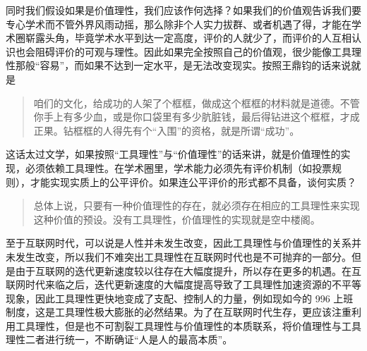 同时我们假设如果是价值理性，我们应该作何选择？如果我们的价值观告诉我们要专心学术而不管外界风雨动摇，那么除非个人实力拔群、或者机遇了得，才能在学术圈崭露头角，毕竟学术水平到达一定高度，评价的人就少了，而评价的人互相认识也会阻碍评价的可观与理性。因此如果完全按照自己的价值观，很少能像工具理性那般“容易”，而如果不达到一定水平，是无法改变现实。按照王鼎钧的话来说就是
\begin{quotation}
    咱们的文化，给成功的人架了个框框，做成这个框框的材料就是道德。不管你手上有多少血，或是你口袋里有多少肮脏钱，最后得钻进这个框框，才成正果。钻框框的人得先有个“入围”的资格，就是所谓“成功”。\cite{wiki2019王鼎钧}
\end{quotation}
这话太过文学，如果按照“工具理性”与“价值理性”的话来讲，就是价值理性的实现，必须依赖工具理性。在学术圈里，学术能力必须先有评价机制（如投票规则），才能实现实质上的公平评价。如果连公平评价的形式都不具备，谈何实质？
\begin{quotation}
    总体上说，只要有一种价值理性的存在，就必须存在相应的工具理性来实现这种价值的预设。没有工具理性，价值理性的实现就是空中楼阁。\cite{mba2019工具理性}
\end{quotation}

至于互联网时代，可以说是人性并未发生改变，因此工具理性与价值理性的关系并未发生改变，所以我们不难突出工具理性在互联网时代也是不可抛弃的一部分。但是由于互联网的迭代更新速度较以往存在大幅度提升，所以存在更多的机遇。在互联网时代来临之后，迭代更新速度的大幅度提高导致了工具理性加速资源的不平等现象，因此工具理性更快地变成了支配、控制人的力量，例如现如今的 996 上班制度，这是工具理性极大膨胀的必然结果。为了在互联网时代生存，更应该注重利用工具理性，但是也不可割裂工具理性与价值理性的本质联系，将价值理性与工具理性二者进行统一，不断确证“人是人的最高本质”。
